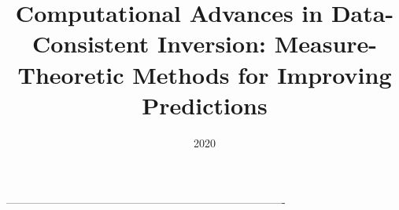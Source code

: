 \documentclass[english,10pt]{ucdenver-dissertation}
\title{Computational Advances in Data-Consistent Inversion: Measure-Theoretic Methods for Improving Predictions}
\date{2020}
\begin{document}


\pagebreak
\FloatBarrier
% 
% 
%
% 
%
% 
%
% 
%
% 
---------------------------------------------------------------------------- %
\renewcommand\bibname{REFERENCES}
\singlespacing

\nocite{*}



\doublespacing

\ucdappendix

%



% 
% 
% 

\end{document}
